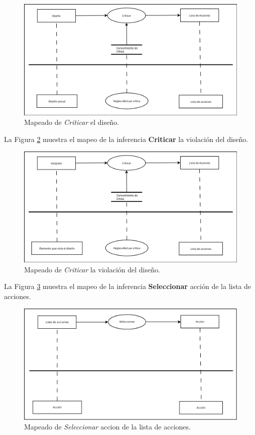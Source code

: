 \begin{figure}[H]
  \centering
  \includegraphics[scale=0.35]{imaxes/DisenoCriticarListaAciones.png}
  \caption{\label{fig:DisenoCriticarListaAciones}Mapeado de \textit{Criticar} el diseño.}
\end{figure}

La Figura \ref{fig:ViolacionCriticarListaAciones} muestra el mapeo de la inferencia \textbf{Criticar} la violación del diseño.

\begin{figure}[H]
  \centering
  \includegraphics[scale=0.35]{imaxes/ViolacionCriticarListaAciones.png}
  \caption{\label{fig:ViolacionCriticarListaAciones}Mapeado de \textit{Criticar} la violación del diseño.}
\end{figure}

La Figura \ref{fig:ListaAccionesSeleccionarAccion} muestra el mapeo de la inferencia \textbf{Seleccionar} acción de la lista de acciones.

\begin{figure}[H]
  \centering
  \includegraphics[scale=0.35]{imaxes/ListaAccionesSeleccionarAccion.png}
  \caption{\label{fig:ListaAccionesSeleccionarAccion}Mapeado de \textit{Seleccionar} accion de la lista de acciones.}
\end{figure}

